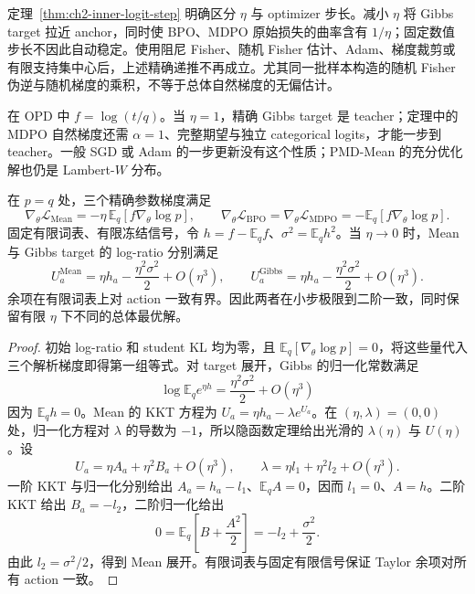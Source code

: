 定理~\ref{thm:ch2-inner-logit-step} 明确区分 $\eta$ 与 optimizer 步长。减小 $\eta$ 将 Gibbs target 拉近 anchor，同时使 BPO、MDPO 原始损失的曲率含有 $1/\eta$；固定数值步长不因此自动稳定。使用阻尼 Fisher、随机 Fisher 估计、Adam、梯度裁剪或有限支持集中心后，上述精确递推不再成立。尤其同一批样本构造的随机 Fisher 伪逆与随机梯度的乘积，不等于总体自然梯度的无偏估计。

在 OPD 中 $f=\log( t/q)$。当 $\eta=1$，精确 Gibbs target 是 teacher；定理中的 MDPO 自然梯度还需 $\alpha=1$、完整期望与独立 categorical logits，才能一步到 teacher。一般 SGD 或 Adam 的一步更新没有这个性质；PMD-Mean 的充分优化解也仍是 Lambert-$W$ 分布。

\begin{proposition}
\label{prop:ch2-eta-initial-scale}
在 $p=q$ 处，三个精确参数梯度满足
\begin{equation*}
 \nabla_\theta\mathcal L_{\mathrm{Mean}}
 =-\eta\,\mathbb E_q[f\nabla_\theta\log p],\qquad
 \nabla_\theta\mathcal L_{\mathrm{BPO}}
 =\nabla_\theta\mathcal L_{\mathrm{MDPO}}
 =-\mathbb E_q[f\nabla_\theta\log p].
\end{equation*}
固定有限词表、有限冻结信号，令 $h=f-\mathbb E_qf$、$\sigma^2=\mathbb E_qh^2$。当 $\eta\to0$ 时，Mean 与 Gibbs target 的 log-ratio 分别满足
\begin{equation*}
 U_a^{\mathrm{Mean}}=\eta h_a-\frac{\eta^2\sigma^2}{2}+O(\eta^3),\qquad
 U_a^{\mathrm{Gibbs}}=\eta h_a-\frac{\eta^2\sigma^2}{2}+O(\eta^3).
\end{equation*}
余项在有限词表上对 action 一致有界。因此两者在小步极限到二阶一致，同时保留有限 $\eta$ 下不同的总体最优解。
\end{proposition}

\begin{proof}
初始 log-ratio 和 student KL 均为零，且 $\mathbb E_q[\nabla_\theta\log p]=0$，将这些量代入三个解析梯度即得第一组等式。对 target 展开，Gibbs 的归一化常数满足
\begin{equation*}
 \log\mathbb E_qe^{\eta h}=\frac{\eta^2\sigma^2}{2}+O(\eta^3)
\end{equation*}
因为 $\mathbb E_qh=0$。Mean 的 KKT 方程为 $U_a=\eta h_a-\lambda e^{U_a}$。在 $(\eta,\lambda)=(0,0)$ 处，归一化方程对 $\lambda$ 的导数为 $-1$，所以隐函数定理给出光滑的 $\lambda(\eta)$ 与 $U(\eta)$。设
\begin{equation*}
 U_a=\eta A_a+\eta^2B_a+O(\eta^3),\qquad
 \lambda=\eta l_1+\eta^2l_2+O(\eta^3).
\end{equation*}
一阶 KKT 与归一化分别给出 $A_a=h_a-l_1$、$\mathbb E_qA=0$，因而 $l_1=0$、$A=h$。二阶 KKT 给出 $B_a=-l_2$，二阶归一化给出
\begin{equation*}
 0=\mathbb E_q\left[B+\frac{A^2}{2}\right]=-l_2+\frac{\sigma^2}{2}.
\end{equation*}
由此 $l_2=\sigma^2/2$，得到 Mean 展开。有限词表与固定有限信号保证 Taylor 余项对所有 action 一致。
\end{proof}

